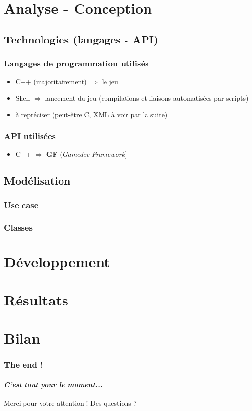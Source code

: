 \documentclass{beamer}
\begin{document}
\section{Analyse - Conception}
\subsection{Technologies (langages - API)}
\begin{frame}
\frametitle{Langages de programmation utilisés}
\begin{itemize}
\item C++ (majoritairement) $\Rightarrow$ le jeu
\item Shell $\Rightarrow$ lancement du jeu (compilations et liaisons automatisées par scripts)
\item à repréciser (peut-être C, XML à voir par la suite)
\end{itemize}
\end{frame}
\begin{frame}
\frametitle{API utilisées}
\begin{itemize}
\item C++ $\Rightarrow$ \textbf{GF} (\textit{Gamedev Framework})
\end{itemize}
\end{frame}
\subsection{Modélisation}
\begin{frame}
\frametitle{Use case}
\end{frame}
\begin{frame}
\frametitle{Classes}
\end{frame}
\section{Développement}
\section{Résultats}
\section{Bilan}
\begin{frame}
\frametitle{The end !}
\framesubtitle{\textit{C'est tout pour le moment...}}
\begin{tcolorbox}[colback=purple!20!white,colframe=purple!60!black]
\begin{center}
Merci pour votre attention ! Des questions ?
\end{center}
\end{tcolorbox}
\end{frame}
\end{document}
